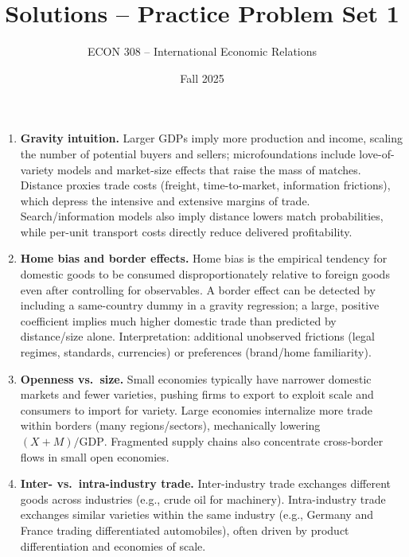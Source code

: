 \documentclass[11pt]{article}
\title{Solutions -- Practice Problem Set 1}
\author{ECON 308 -- International Economic Relations}
\date{Fall 2025}
\begin{document}
\maketitle



\begin{enumerate}[leftmargin=*]
\item \textbf{Gravity intuition.} Larger GDPs imply more production and income, scaling the number of potential buyers and sellers; microfoundations include love-of-variety models and market-size effects that raise the mass of matches. Distance proxies trade costs (freight, time-to-market, information frictions), which depress the intensive and extensive margins of trade. Search/information models also imply distance lowers match probabilities, while per-unit transport costs directly reduce delivered profitability.

\item \textbf{Home bias and border effects.} Home bias is the empirical tendency for domestic goods to be consumed disproportionately relative to foreign goods even after controlling for observables. A border effect can be detected by including a same-country dummy in a gravity regression; a large, positive coefficient implies much higher domestic trade than predicted by distance/size alone. Interpretation: additional unobserved frictions (legal regimes, standards, currencies) or preferences (brand/home familiarity).

\item \textbf{Openness vs.\ size.} Small economies typically have narrower domestic markets and fewer varieties, pushing firms to export to exploit scale and consumers to import for variety. Large economies internalize more trade within borders (many regions/sectors), mechanically lowering $(X{+}M)/\text{GDP}$. Fragmented supply chains also concentrate cross-border flows in small open economies.

\item \textbf{Inter- vs.\ intra-industry trade.} Inter-industry trade exchanges different goods across industries (e.g., crude oil for machinery). Intra-industry trade exchanges similar varieties within the same industry (e.g., Germany and France trading differentiated automobiles), often driven by product differentiation and economies of scale.
\end{enumerate}
\end{document}

